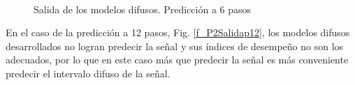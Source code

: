 \documentclass[12pt]{article}
\begin{document}
\begin{figure}
		\centering
		\captionsetup{justification=centering}
		\\
		\caption{Salida de los modelos difusos. Predicción a 6 pasos}
		\label{f_P2Salidap6}
\end{figure}

En el caso de la predicción a 12 pasos, Fig. \ref{f_P2Salidap12}, los modelos difusos desarrollados no logran predecir la señal y sus índices de desempeño no son los adecuados, por lo que en este caso más que predecir la señal es más conveniente predecir el intervalo difuso de la señal.
\end{document}
